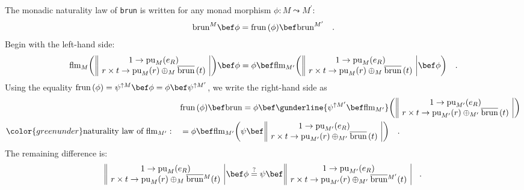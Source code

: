 The monadic naturality law of \lstinline!brun! is written for any
monad morphism $\phi:M\leadsto M^{\prime}$:
\[
\text{brun}^{M}\bef\phi=\text{frun}\,(\phi)\bef\text{brun}^{M^{\prime}}\quad.
\]
Begin with the left-hand side:
\[
\text{flm}_{M}\bigg(\,\begin{array}{||c|}
1\rightarrow\text{pu}_{M}(e_{R})\\
r\times t\rightarrow\text{pu}_{M}(r)\oplus_{M}\overline{\text{brun}}\,(t)
\end{array}\,\bigg)\bef\phi=\phi\bef\text{flm}_{M^{\prime}}\bigg(\,\begin{array}{||c|}
1\rightarrow\text{pu}_{M}(e_{R})\\
r\times t\rightarrow\text{pu}_{M}(r)\oplus_{M}\overline{\text{brun}}\,(t)
\end{array}\,\bef\phi\bigg)\quad.
\]
Using the equality $\text{frun}\,(\phi)=\psi^{\uparrow M}\bef\phi=\phi\bef\psi^{\uparrow M^{\prime}}$,
we write the right-hand side as
\begin{align*}
 & \text{frun}\,(\phi)\bef\text{brun}=\phi\bef\gunderline{\psi^{\uparrow M^{\prime}}\bef\text{flm}_{M^{\prime}}}\bigg(\,\begin{array}{||c|}
1\rightarrow\text{pu}_{M^{\prime}}(e_{R})\\
r\times t\rightarrow\text{pu}_{M^{\prime}}(r)\oplus_{M^{\prime}}\overline{\text{brun}}\,(t)
\end{array}\,\bigg)\\
{\color{greenunder}\text{naturality law of }\text{flm}_{M^{\prime}}:}\quad & =\phi\bef\text{flm}_{M^{\prime}}\bigg(\psi\bef\,\begin{array}{||c|}
1\rightarrow\text{pu}_{M^{\prime}}(e_{R})\\
r\times t\rightarrow\text{pu}_{M^{\prime}}(r)\oplus_{M^{\prime}}\overline{\text{brun}}\,(t)
\end{array}\,\bigg)\quad.
\end{align*}
The remaining difference is:
\[
\begin{array}{||c|}
1\rightarrow\text{pu}_{M}(e_{R})\\
r\times t\rightarrow\text{pu}_{M}(r)\oplus_{M}\overline{\text{brun}}{}^{M}(t)
\end{array}\,\bef\phi\overset{?}{=}\psi\bef\,\begin{array}{||c|}
1\rightarrow\text{pu}_{M^{\prime}}(e_{R})\\
r\times t\rightarrow\text{pu}_{M^{\prime}}(r)\oplus_{M^{\prime}}\overline{\text{brun}}{}^{M^{\prime}}(t)
\end{array}\quad.
\]
